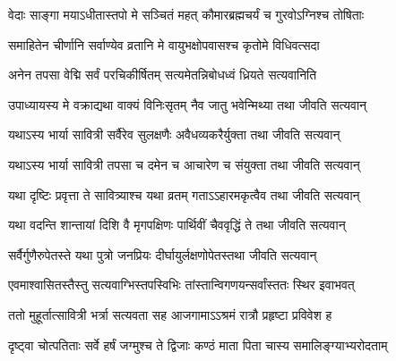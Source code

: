 


\twolineshloka
{वेदाः साङ्गा मयाऽधीतास्तपो मे सञ्चितं महत्}
{कौमारब्रह्मचर्यं च गुरवोऽग्निश्च तोषिताः}


\twolineshloka
{समाहितेन चीर्णानि सर्वाण्येव व्रतानि मे}
{वायुभक्षोपवासश्च कृतोमे विधिवत्सदा}


\twolineshloka
{अनेन तपसा वेद्मि सर्वं परचिकीर्षितम्}
{सत्यमेतन्निबोधध्वं ध्रियते सत्यवानिति}




\twolineshloka
{उपाध्यायस्य मे वक्राद्यथा वाक्यं विनिःसृतम्}
{नैव जातु भवेन्मिथ्या तथा जीवति सत्यवान्}




\twolineshloka
{यथाऽस्य भार्या सावित्री सर्वैरेव सुलक्षणैः}
{अवैधव्यकरैर्युक्ता तथा जीवति सत्यवान्}




\twolineshloka
{यथाऽस्य भार्या सावित्री तपसा च दमेन च}
{आचारेण च संयुक्ता तथा जीवति सत्यवान्}




\twolineshloka
{यथा दृष्टिः प्रवृत्ता ते सावित्र्याश्च यथा व्रतम्}
{गताऽऽहारमकृत्वैव तथा जीवति सत्यवान्}




\twolineshloka
{यथा वदन्ति शान्तायां दिशि वै मृगपक्षिणः}
{पार्थिवीं चैववृद्धिं ते तथा जीवति सत्यवान्}




\twolineshloka
{सर्वैर्गुणैरुपेतस्ते यथा पुत्रो जनप्रियः}
{दीर्घायुर्लक्षणोपेतस्तथा जीवति सत्यवान्}




\twolineshloka
{एवमाश्वासितस्तैस्तु सत्यवाग्भिस्तपस्विभिः}
{तांस्तान्विगणयन्सर्वांस्ततः स्थिर इवाभवत्}


\twolineshloka
{ततो मुहूर्तात्सावित्री भर्त्रा सत्यवता सह}
{आजगामाऽऽश्रमं रात्रौ प्रहृष्टा प्रविवेश ह}


\twolineshloka
{दृष्ट्वा चोत्पतिताः सर्वे हर्षं जग्मुश्च ते द्विजाः}
{कण्ठं माता पिता चास्य  समालिङ्ग्याभ्यरोदताम्}




